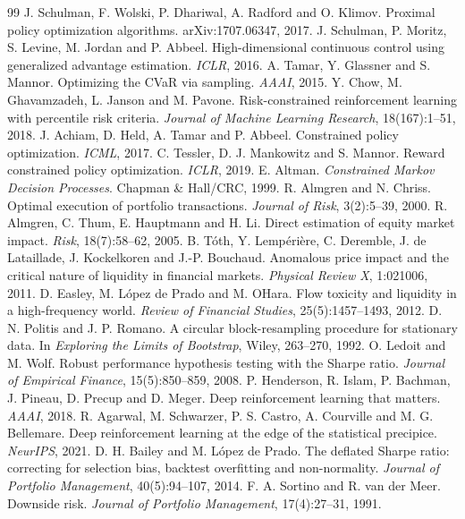 \documentclass[11pt]{article}
\begin{document}
\begin{thebibliography}{99}
 J. Schulman, F. Wolski, P. Dhariwal, A. Radford and O. Klimov. Proximal policy optimization algorithms. arXiv:1707.06347, 2017.
 J. Schulman, P. Moritz, S. Levine, M. Jordan and P. Abbeel. High-dimensional continuous control using generalized advantage estimation. \emph{ICLR}, 2016.
 A. Tamar, Y. Glassner and S. Mannor. Optimizing the CVaR via sampling. \emph{AAAI}, 2015.
 Y. Chow, M. Ghavamzadeh, L. Janson and M. Pavone. Risk-constrained reinforcement learning with percentile risk criteria. \emph{Journal of Machine Learning Research}, 18(167):1--51, 2018.
 J. Achiam, D. Held, A. Tamar and P. Abbeel. Constrained policy optimization. \emph{ICML}, 2017.
 C. Tessler, D. J. Mankowitz and S. Mannor. Reward constrained policy optimization. \emph{ICLR}, 2019.
 E. Altman. \emph{Constrained Markov Decision Processes}. Chapman \& Hall/CRC, 1999.
 R. Almgren and N. Chriss. Optimal execution of portfolio transactions. \emph{Journal of Risk}, 3(2):5--39, 2000.
 R. Almgren, C. Thum, E. Hauptmann and H. Li. Direct estimation of equity market impact. \emph{Risk}, 18(7):58--62, 2005.
 B. Tóth, Y. Lempérière, C. Deremble, J. de Lataillade, J. Kockelkoren and J.-P. Bouchaud. Anomalous price impact and the critical nature of liquidity in financial markets. \emph{Physical Review X}, 1:021006, 2011.
 D. Easley, M. López de Prado and M. O\textquotesingle Hara. Flow toxicity and liquidity in a high-frequency world. \emph{Review of Financial Studies}, 25(5):1457--1493, 2012.
 D. N. Politis and J. P. Romano. A circular block-resampling procedure for stationary data. In \emph{Exploring the Limits of Bootstrap}, Wiley, 263--270, 1992.
 O. Ledoit and M. Wolf. Robust performance hypothesis testing with the Sharpe ratio. \emph{Journal of Empirical Finance}, 15(5):850--859, 2008.
 P. Henderson, R. Islam, P. Bachman, J. Pineau, D. Precup and D. Meger. Deep reinforcement learning that matters. \emph{AAAI}, 2018.
 R. Agarwal, M. Schwarzer, P. S. Castro, A. Courville and M. G. Bellemare. Deep reinforcement learning at the edge of the statistical precipice. \emph{NeurIPS}, 2021.
 D. H. Bailey and M. López de Prado. The deflated Sharpe ratio: correcting for selection bias, backtest overfitting and non-normality. \emph{Journal of Portfolio Management}, 40(5):94--107, 2014.
 F. A. Sortino and R. van der Meer. Downside risk. \emph{Journal of Portfolio Management}, 17(4):27--31, 1991.

\end{thebibliography}
\end{document}

